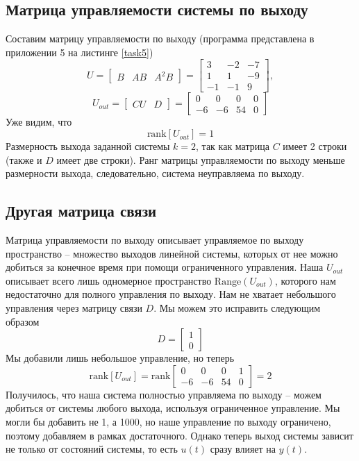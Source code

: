 \documentclass[a4paper, 12pt]{article}
\begin{document}
    \subsection{Матрица управляемости системы по выходу}
    Составим матрицу управляемости по выходу (программа представлена в приложении 5 на листинге \ref{task5})
    $$
    U=\begin{bmatrix}
        B &AB & A^2B
    \end{bmatrix}=\begin{bmatrix}
        3    &-2    &-7\\
     1     &1    &-9\\
    -1    &-1     &9
    \end{bmatrix},
    $$
    $$
    U_{out}=\begin{bmatrix}
        CU &D
    \end{bmatrix}=\begin{bmatrix}
        0     &0     &0     &0\\
    -6    &-6    &54     &0
    \end{bmatrix}
    $$
    Уже видим, что
    $$
    \text{rank}\left[U_{out}\right]=1
    $$
    Размерность выхода заданной системы $k=2$, так как матрица $C$ имеет 2 строки (также и $D$ имеет две строки).
    Ранг матрицы управляемости по выходу меньше размерности выхода, следовательно, система неуправляема по выходу.


    \subsection{Другая матрица связи}
    Матрица управляемости по выходу описывает управляемое по выходу пространство -- множество выходов
    линейной системы, которых от нее можно добиться за конечное время при помощи ограниченного управления.
    Наша $U_{out}$ описывает всего лишь одномерное пространство $\text{Range}\left(U_{out}\right)$, которого нам недостаточно для полного управления
    по выходу. Нам не хватает небольшого управления через матрицу связи $D$. Мы можем это исправить следующим образом
    $$
    D=\begin{bmatrix}
        1\\ 0
    \end{bmatrix}
    $$
    Мы добавили лишь небольшое управление, но теперь
    $$\text{rank}\left[U_{out}\right]=\text{rank}\begin{bmatrix}
    0     &0     &0     &1\\
    -6    &-6    &54     &0
    \end{bmatrix}=2$$
    Получилось, что наша система полностью управляема по выходу -- можем добиться от системы любого выхода, используя ограниченное управление.
    Мы могли бы добавить не 1, а 1000, но наше управление по выходу ограничено, поэтому
    добавляем в рамках достаточного. Однако теперь выход системы зависит не только от состояний системы,
    то есть $u(t)$ сразу влияет на $y(t)$.
\end{document}
